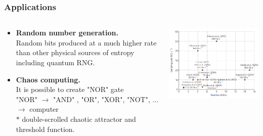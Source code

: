 


\begin{frame}
\frametitle{Applications}
\begin{columns}
\begin{column}{0.5\linewidth}       
\begin{itemize}
\item \textbf{Random number generation.}    \\
Random bits produced at a much higher rate than other physical sources of entropy including quantum RNG.    
\item \textbf{Chaos computing.} \\
It is possible to create "NOR" gate\\
"NOR" $\to$ "AND" , "OR", "XOR", "NOT", ... $\to$ computer \\
$\ast$ double-scrolled chaotic attractor and threshold function. 
\end{itemize}
\end{column}
\begin{column}{0.5\linewidth}
    \includegraphics[width=\linewidth]{images/ChaosRNG.png}
\end{column}
\end{columns}
\end{frame}